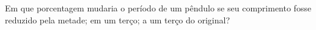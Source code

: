 Em que porcentagem mudaria o período de um pêndulo se seu comprimento fosse reduzido pela metade; em um terço; a um terço do original?

